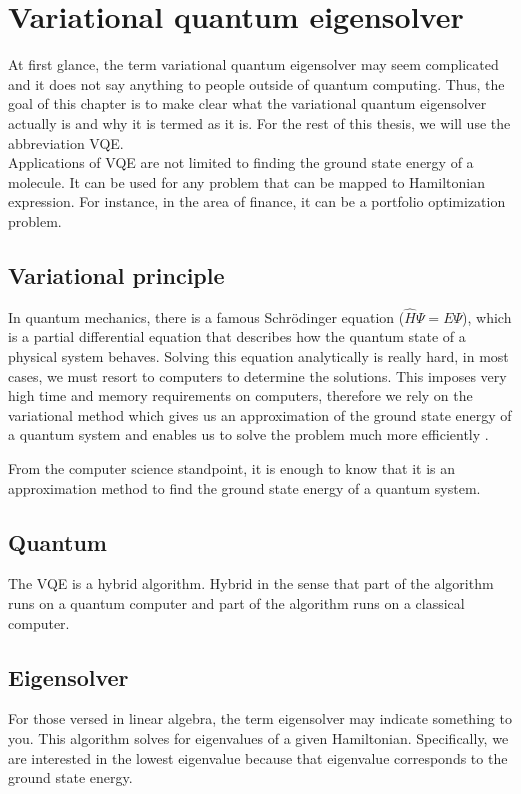 \chapter{Variational quantum eigensolver}\label{ch:vqe}
At first glance, the term variational quantum eigensolver may seem complicated and it does not say anything to people outside of quantum computing. Thus, the goal of this chapter is to make clear what the variational quantum eigensolver actually is and why it is termed as it is. For the rest of this thesis, we will use the abbreviation VQE.\\

Applications of VQE are not limited to finding the ground state energy of a molecule. It can be used for any problem that can be mapped to Hamiltonian expression. For instance, in the area of finance, it can be a portfolio optimization problem. 

\section{Variational principle}
In quantum mechanics, there is a famous Schrödinger equation ($\hat{H} \Psi = E \Psi$), which is a partial differential equation that describes how the quantum state of a physical system behaves. Solving this equation analytically  is really hard, in most cases, we must resort to computers to determine the solutions. This imposes very high time and memory requirements on computers, therefore we rely on the variational method which gives us an approximation of the ground state energy of a quantum system and enables us to solve the problem much more efficiently \cite{Thijssen_2007}.

From the computer science standpoint, it is enough to know that it is an approximation method to find the ground state energy of a quantum system.
\section{Quantum}
The VQE is a hybrid algorithm. Hybrid in the sense that part of the algorithm runs on a quantum computer and part of the algorithm runs on a classical computer.  

\section{Eigensolver}
For those versed in linear algebra, the term eigensolver may indicate something to you. This algorithm solves for eigenvalues of a given Hamiltonian. Specifically, we are interested in the lowest eigenvalue because that eigenvalue corresponds to the ground state energy.

